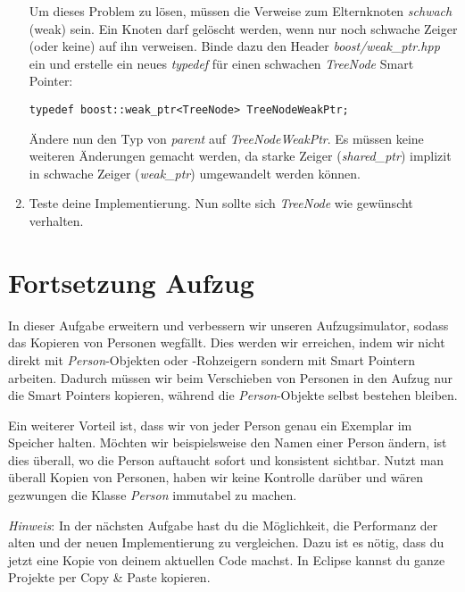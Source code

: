 \documentclass[
  accentcolor=tud1c,	%
  colorbacktitle,		%
  inverttitle,			%
  german,				%
  twoside
]{tudexercise}
\begin{document}
\begin{enumerate}
Um dieses Problem zu lösen, müssen die Verweise zum Elternknoten \emph{schwach} (weak) sein.
Ein Knoten darf gelöscht werden, wenn nur noch schwache Zeiger (oder keine) auf ihn verweisen.
Binde dazu den Header \emph{boost/weak\_ptr.hpp} ein und erstelle ein neues \emph{typedef} für einen schwachen \emph{TreeNode} Smart Pointer:

\begin{lstlisting}
typedef boost::weak_ptr<TreeNode> TreeNodeWeakPtr;
\end{lstlisting}

Ändere nun den Typ von \emph{parent} auf \emph{TreeNodeWeakPtr}.
Es müssen keine weiteren Änderungen gemacht werden, da starke Zeiger (\emph{shared\_ptr}) implizit in schwache Zeiger (\emph{weak\_ptr}) umgewandelt werden können.

\item
Teste deine Implementierung.
Nun sollte sich \emph{TreeNode} wie gewünscht verhalten.

\end{enumerate}



\section{Fortsetzung Aufzug}
In dieser Aufgabe erweitern und verbessern wir unseren Aufzugsimulator, sodass das Kopieren von Personen wegfällt.
Dies werden wir erreichen, indem wir nicht direkt mit \emph{Person}-Objekten oder -Rohzeigern sondern mit Smart Pointern arbeiten.
Dadurch müssen wir beim Verschieben von Personen in den Aufzug nur die Smart Pointers kopieren, während die \emph{Person}-Objekte selbst bestehen bleiben.

Ein weiterer Vorteil ist, dass wir von jeder Person genau ein Exemplar im Speicher halten.
Möchten wir beispielsweise den Namen einer Person ändern, ist dies überall, wo die Person auftaucht sofort und konsistent sichtbar.
Nutzt man überall Kopien von Personen, haben wir keine Kontrolle darüber und wären gezwungen die Klasse \emph{Person} immutabel zu machen.

\emph{Hinweis}:
In der nächsten Aufgabe hast du die Möglichkeit, die Performanz der alten und der neuen Implementierung zu vergleichen.
Dazu ist es nötig, dass du jetzt eine Kopie von deinem aktuellen Code machst.
In Eclipse kannst du ganze Projekte per Copy \& Paste kopieren.
\end{document}
